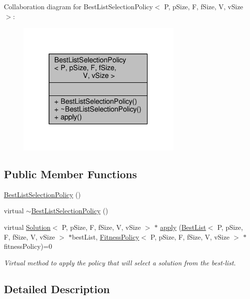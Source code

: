 Collaboration diagram for Best\+List\+Selection\+Policy$<$ P, p\+Size, F, f\+Size, V, v\+Size $>$\+:
\nopagebreak
\begin{figure}[H]
\begin{center}
\leavevmode
\includegraphics[width=232pt]{classBestListSelectionPolicy__coll__graph}
\end{center}
\end{figure}
\subsection*{Public Member Functions}
\begin{DoxyCompactItemize}
\item 
\hyperlink{classBestListSelectionPolicy_a20a7af0bb2e775d20048ac5eb7d624ba}{Best\+List\+Selection\+Policy} ()
\item 
virtual \hyperlink{classBestListSelectionPolicy_a9b3f3d69b8bba7506e89eaf00b4d1c08}{$\sim$\+Best\+List\+Selection\+Policy} ()
\item 
virtual \hyperlink{classSolution}{Solution}$<$ P, p\+Size, F, f\+Size, V, v\+Size $>$ $\ast$ \hyperlink{classBestListSelectionPolicy_ae387a1ef0a3a597134edf198e5ab1299}{apply} (\hyperlink{classBestList}{Best\+List}$<$ P, p\+Size, F, f\+Size, V, v\+Size $>$ $\ast$best\+List, \hyperlink{classFitnessPolicy}{Fitness\+Policy}$<$ P, p\+Size, F, f\+Size, V, v\+Size $>$ $\ast$fitness\+Policy)=0
\begin{DoxyCompactList}\small\item\em Virtual method to apply the policy that will select a solution from the best-\/list. \end{DoxyCompactList}\end{DoxyCompactItemize}


\subsection{Detailed Description}
